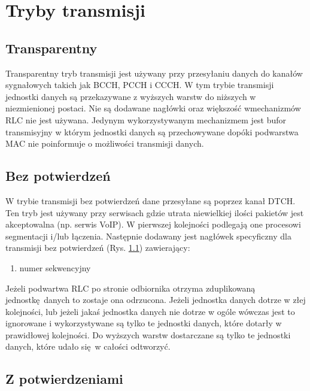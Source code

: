 \section{Tryby transmisji}

\subsection{Transparentny}

Transparentny tryb transmisji jest używany przy przesyłaniu danych do kanałów sygnałowych takich jak BCCH, PCCH i CCCH. W tym trybie transmisji jednostki danych są przekazywane z wyższych warstw do niższych w niezmienionej postaci. Nie są dodawane nagłówki oraz większość wmechanizmów RLC nie jest używana. Jedynym wykorzystywanym mechanizmem jest bufor transmisyjny w którym jednostki danych są przechowywane dopóki podwarstwa MAC nie poinformuje o możliwości transmisji danych.

\subsection{Bez potwierdzeń}
\label{subsec:um}

W trybie transmisji bez potwierdzeń dane przesyłane są poprzez kanał DTCH. Ten tryb jest używany przy serwisach gdzie utrata niewielkiej ilości pakietów jest akceptowalna (np. serwis VoIP). W pierwszej kolejności podlegają one procesowi segmentacji i/lub łączenia. Następnie dodawany jest nagłówek specyficzny dla transmisji bez potwierdzeń (Rys. \ref{}) zawierający: 
\begin{enumerate}
	\item numer sekwencyjny
\end{enumerate}
 Jeżeli podwartwa RLC po stronie odbiornika otrzyma zduplikowaną jednostkę danych to zostaje ona odrzucona. Jeżeli jednostka danych dotrze w złej kolejności, lub jeżeli jakaś jednostka danych nie dotrze w ogóle wówczas jest to ignorowane i wykorzystywane są tylko te jednostki danych, które dotarły w prawidłowej kolejności. Do wyższych warstw dostarczane są tylko te jednostki danych, które udało się w całości odtworzyć. 

\subsection{Z potwierdzeniami}
\label{subsec:am}

